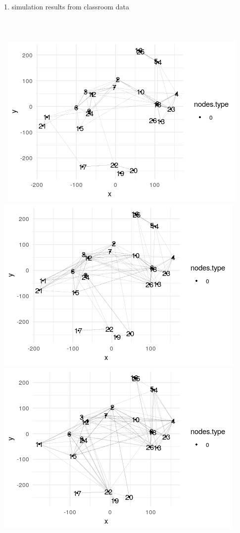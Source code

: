 \documentclass{article}
\begin{document}
1. simulation results from classroom data
\\\\\\\\\
\includegraphics[scale=1]{classroom_t1.png}
\includegraphics[scale=1]{classroom_t2.png}
\includegraphics[scale=1]{classroom_t3.png}
\end{document}
